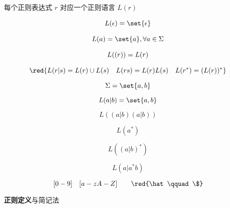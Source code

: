 \begin{frame}{}
  \begin{center}
    每个正则表达式 $r$ 对应一个正则语言 $L(r)$
  \end{center}

  \begin{definition}[正则表达式对应的正则语言]
    \begin{gather}
      L(\epsilon) = \set{\epsilon} \\[8pt]
      L(a) = \set{a}, \forall a \in \Sigma \\[8pt]
      L((r)) = L(r) \\[8pt]
      \red{L(r|s) = L(r) \cup L(s) \quad L(rs) = L(r)L(s) 
      \quad L(r^{\ast}) = (L(r))^{\ast}}
    \end{gather}
  \end{definition}
\end{frame}

\begin{frame}{}
  \[
    \Sigma = \set{a, b}
  \]

  \[
    L(a | b) = \set{a, b}
  \]

  \pause
  \[
    L((a | b) (a | b))
  \]

  \pause
  \[
    L(a^{\ast})
  \]

  \pause
  \[
    L((a | b)^{\ast})
  \]

  \pause
  \[
    L(a | a^{\ast}b)
  \]
\end{frame}

\begin{frame}{}
\end{frame}

\begin{frame}{}
  \[
    [0-9] \quad [a-zA-Z] \qquad \red{\hat\qquad \$}
  \]
\end{frame}

\begin{frame}{}
  \begin{center}
    {\bf 正则定义}与简记法
  \end{center}

\end{frame}


